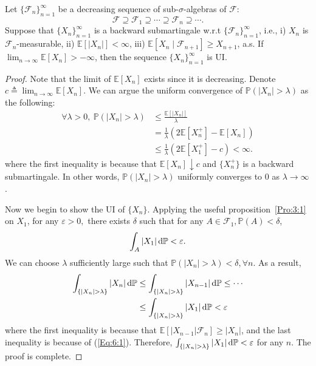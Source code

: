 \begin{proposition}
Let $\{\mathcal{F}_n\}_{n=1}^\infty$ be a decreasing sequence of sub-$\sigma$-algebras of $\mathcal{F}$:
\[
\mathcal{F}\supseteq\mathcal{F}_1\supseteq\cdots\supseteq\mathcal{F}_n\supseteq\cdots.
\]
Suppose that $\{X_n\}_{n=1}^\infty$ is a backward submartingale w.r.t $\{\mathcal{F}_n\}_{n=1}^\infty$, i.e., i) $X_n$ is $\mathcal{F}_n$-measurable, ii) $\mathbb{E}[|X_n|]<\infty$,
iii) $\mathbb{E}[X_n\mid\mathcal{F}_{n+1}]\ge X_{n+1}$, a.s.
If $\lim_{n\to\infty}\mathbb{E}[X_n]>-\infty$, then the sequence $\{X_n\}_{n=1}^\infty$ is UI.
\end{proposition}

\begin{proof}
Note that the limit of $\mathbb{E}[X_n]$ exists since it is decreasing. Denote $c\triangleq \lim_{n\to\infty}\mathbb{E}[X_n]$.
We can argue the uniform convergence of $\mathbb{P}(|X_n|>\lambda)$ as the following:
\begin{align*}
\forall\lambda>0,~
\mathbb{P}(|X_n|>\lambda)&\le \frac{\mathbb{E}[|X_n|]}{\lambda}\\
&=\frac{1}{\lambda}\left(
2\mathbb{E}[X_n^+]-\mathbb{E}[X_n]
\right)\\
&\le \frac{1}{\lambda}\left(
2\mathbb{E}[X_1^+]-c
\right)<\infty.
\end{align*}
where the first inequality is because that $\mathbb{E}[X_n]\downarrow c$ and 
$\{X_n^+\}$ is a backward submartingale.
In other words, $\mathbb{P}(|X_n|>\lambda)$ uniformly converges to $0$ as $\lambda\to\infty$.

Now we begin to show the UI of $\{X_n\}$. Applying the useful proposition~\ref{Pro:3:1} on $X_1$, 
for any $\varepsilon>0,$ there exists $\delta$ such that for any $A\in\mathcal{F}_1,\mathbb{P}(A)<\delta$,
\begin{equation}\label{Eq:6:1}
\int_A|X_1|\diff\mathbb{P}<\varepsilon.
\end{equation}
We can choose $\lambda$ sufficiently large such that $\mathbb{P}(|X_n|>\lambda)<\delta,\forall n$.
As a result,
\begin{align*}
\int_{\{|X_n|>\lambda\}}|X_n|\diff\mathbb{P}&
\le \int_{\{|X_n|>\lambda\}}|X_{n-1}|\diff\mathbb{P}\le\cdots\\
&\le \int_{\{|X_n|>\lambda\}}|X_1|\diff\mathbb{P}<\varepsilon
\end{align*}
where the first inequality is because that $\mathbb{E}[|X_{n-1}|\mathcal{F}_n]\ge|X_n|$,
and the last inequality is because of (\ref{Eq:6:1}).
Therefore, $\int_{\{|X_n|>\lambda\}}|X_1|\diff\mathbb{P}<\varepsilon$ for any $n$.
The proof is complete.
\end{proof}

